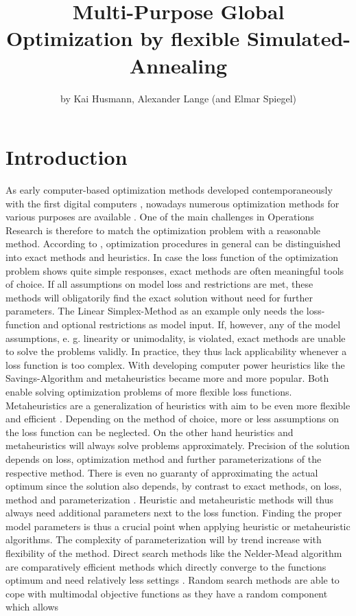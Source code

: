 \title{Multi-Purpose Global Optimization by flexible Simulated-Annealing}
\author{by Kai Husmann, Alexander Lange (and Elmar Spiegel)}

\maketitle


\section{Introduction}

As early computer-based optimization methods developed contemporaneously with the first digital computers \citep{corana_1987}, nowadays numerous optimization methods for various purposes are available \citep{wegener_2005}. One of the main challenges in Operations Research is therefore to match the optimization problem with a reasonable method. According to  \citet{kirkpatrick_1983}, optimization procedures in general can be distinguished into exact methods and heuristics. In case the loss function of the optimization problem shows quite simple responses, exact methods are often meaningful tools of choice. If all assumptions on model loss and restrictions are met, these methods will obligatorily find the exact solution without need for further parameters. The  Linear Simplex-Method \citep{dantzig_1959} as an example only needs the loss-function and optional restrictions as model input. If, however, any of the model assumptions, e. g. linearity or unimodality, is violated, exact methods are unable to solve the problems validly. In practice, they thus lack applicability whenever a loss function is too complex. With developing computer power heuristics like the Savings-Algorithm \citep{clarke_1964} and metaheuristics became more and more popular. Both enable solving optimization problems of more flexible loss functions. Metaheuristics are a generalization of heuristics with aim to be even more flexible and efficient \citep{blum_2003}. Depending on the method of choice, more or less assumptions on the loss function can be neglected. On the other hand heuristics and metaheuristics will always solve problems approximately. Precision of the solution depends on loss, optimization method and further parameterizations of the respective method. There is even no guaranty of approximating the actual optimum since the solution also depends, by contrast to exact methods, on loss, method and parameterization \citep{blum_2003}. Heuristic and metaheuristic methods will thus always need additional parameters next to the loss function. Finding the proper model parameters is thus a crucial point when applying heuristic or metaheuristic algorithms. The complexity of parameterization will by trend increase with flexibility of the method. Direct search methods like the Nelder-Mead algorithm are comparatively efficient methods which directly converge to the functions optimum and need relatively less settings \citep{geiger_1999}. Random search methods are able to cope with multimodal objective functions as they have a random component which allows 
